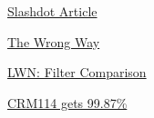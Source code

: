               
              
              
                \href{http://developers.slashdot.org/article.pl?sid=02/08/16/1428238\&mode=thread\&tid=156}{Slashdot Article}

              
            
            
              
            
            
              
            
            
              
                \href{http://office.microsoft.com/Assistance/9798/newfilters.aspx}{The Wrong Way}

              
              
              
                \href{http://lwn.net/Articles/9460/}{LWN: Filter Comparison}

              
            
            
              
            
            
              
            
            
              
                \href{http://www.paulgraham.com/wsy.html}{CRM114 gets 99.87\%}

              
            
            
              
            
          
